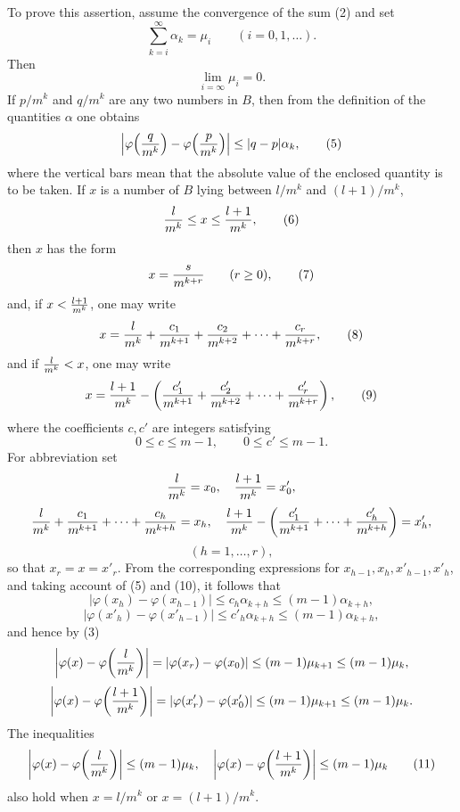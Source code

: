 \documentclass[11pt,a4paper]{article}
\begin{document}
To prove this assertion, assume the convergence of the sum (2) and set
\begin{equation}
 \sum_{k=i}^{\infty}\alpha_k=\mu_i\qquad (i=0,1,\ldots).
\tag{3}
\end{equation}
Then
\begin{equation}
 \lim_{i=\infty}\mu_i=0.
\tag{4}
\end{equation}
If $p/m^k$ and $q/m^k$ are any two numbers in $B$, then from the definition of the quantities $\alpha$ one obtains
\begin{equation}
 \left|\varphi\!\left({q\over m^k}\right)-\varphi\!\left({p\over m^k}\right)\right|\le |q-p|\alpha_k,
\tag{5}
\end{equation}
where the vertical bars mean that the absolute value of the enclosed quantity is to be taken. If $x$ is a number of $B$ lying between $l/m^k$ and $(l+1)/m^k$,
\begin{equation}
 {l\over m^k}\le x\le {l+1\over m^k},
\tag{6}
\end{equation}
then $x$ has the form
\begin{equation}
 x={s\over m^{k+r}}\qquad (r\ge0),
\tag{7}
\end{equation}
and, if $x<{l+1\over m^k}$, one may write
\begin{equation}
 x={l\over m^k}+{c_1\over m^{k+1}}+{c_2\over m^{k+2}}+\cdots+{c_r\over m^{k+r}},
\tag{8}
\end{equation}
and if ${l\over m^k}<x$, one may write
\begin{equation}
 x={l+1\over m^k}-\left({c'_1\over m^{k+1}}+{c'_2\over m^{k+2}}+\cdots+{c'_r\over m^{k+r}}\right),
\tag{9}
\end{equation}
where the coefficients $c,c'$ are integers satisfying
\begin{equation}
 0\le c\le m-1,
 \qquad
 0\le c'\le m-1.
\tag{10}
\end{equation}
For abbreviation set
\[
 {l\over m^k}=x_0,
 \quad
 {l+1\over m^k}=x'_0,
\]
\[
 {l\over m^k}+{c_1\over m^{k+1}}+\cdots+{c_h\over m^{k+h}}=x_h,
 \quad
 {l+1\over m^k}-\left({c'_1\over m^{k+1}}+\cdots+{c'_h\over m^{k+h}}\right)=x'_h,
\]
\[
 (h=1,\ldots,r),
\]
so that $x_r=x=x'_r$. From the corresponding expressions for $x_{h-1},x_h,x'_{h-1},x'_h$, and taking account of (5) and (10), it follows that
\[
 \left|\varphi(x_h)-\varphi(x_{h-1})\right|\le c_h\alpha_{k+h}\le(m-1)\alpha_{k+h},
\]
\[
 \left|\varphi(x'_h)-\varphi(x'_{h-1})\right|\le c'_h\alpha_{k+h}\le(m-1)\alpha_{k+h},
\]
and hence by (3)
\[
 \left|\varphi(x)-\varphi\!\left({l\over m^k}\right)\right|=|\varphi(x_r)-\varphi(x_0)|\le(m-1)\mu_{k+1}\le(m-1)\mu_k,
\]
\[
 \left|\varphi(x)-\varphi\!\left({l+1\over m^k}\right)\right|=|\varphi(x'_r)-\varphi(x'_0)|\le(m-1)\mu_{k+1}\le(m-1)\mu_k.
\]
The inequalities
\begin{equation}
 \left|\varphi(x)-\varphi\!\left({l\over m^k}\right)\right|\le(m-1)\mu_k,
 \quad
 \left|\varphi(x)-\varphi\!\left({l+1\over m^k}\right)\right|\le(m-1)\mu_k
\tag{11}
\end{equation}
also hold when $x=l/m^k$ or $x=(l+1)/m^k$.
\end{document}
